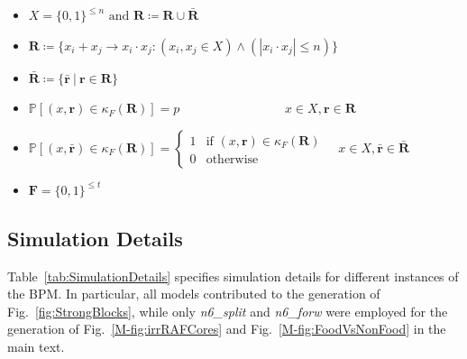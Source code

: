 \documentclass[pdflatex]{sn-jnl}
\theoremstyle{thmstyleone}%
\theoremstyle{examplesty}%
\theoremstyle{thmstylethree}%
\newcommand{\food}{\ensuremath{\mathbf{F}}}
\newcommand{\FR}[0]{\mathbf{R}}
\newcommand{\fr}[0]{\mathbf{r}}
\newcommand{\cat}{\kappa_F}
\begin{document}
\begin{itemize}
  \item {$X = \{0,1\}^{\leq n} \text{ and } \FR \coloneqq \FR \cup \bar{\FR}$}\\[-0.5em]
  \item {$\FR \coloneqq \{x_i + x_j \rightarrow x_i \cdot x_j : (x_i, x_j \in X) \wedge (|x_i \cdot x_j| \leq n)\}$}\\[-0.5em]
  \item {$\bar{\FR} \coloneqq \{\bar{\fr} \ \vert \ \fr \in \FR \}$} \\[-0.5em]
  \item {$\mathbb{P}[(x, \fr) \in \cat(\FR)] = p \hspace{100pt} x\in X, \fr \in \FR$}\\[-0.5em]
  \item {$\mathbb{P}[(x, \bar{\fr}) \in \cat(\FR)] = \begin{cases} 1 & \text{if } (x, \fr) \in \cat(\FR) \\ 0 & \text{otherwise} \end{cases} \quad x\in X, \bar{\fr}\in \bar{\FR}$}\\[-0.5em]
  \item {$\food = \{0,1\}^{\leq t}$}\\[-0.5em]
\end{itemize}

\subsection{Simulation Details}

Table~\ref{tab:SimulationDetails} specifies simulation details for different instances of the BPM.
In particular, all models contributed to the generation of Fig.~\ref{fig:StrongBlocks}, while only \textit{n6\_split} 
and \textit{n6\_forw} were employed for the generation of Fig.~\ref{M-fig:irrRAFCores} and Fig.~\ref{M-fig:FoodVsNonFood} 
in the main text.
\end{document}
